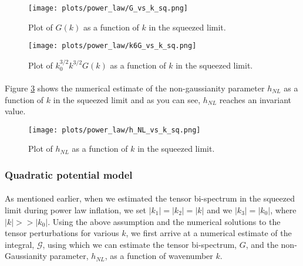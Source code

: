\documentclass[12pt,a4paper,oneside]{book}
\begin{document}
\begin{figure}
\begin{center}
\texttt{[image: plots/power\_law/G\_vs\_k\_sq.png]}
\caption[Plot of $G(k)$ as a function of $k$ in the squeezed limit in power law inflation.]
{Plot of $G(k)$ as a function of $k$ in the squeezed limit.}
\label{fig:sq_G_vs_k}
\end{center}
\end{figure}

\begin{figure}
\begin{center}
\texttt{[image: plots/power\_law/k6G\_vs\_k\_sq.png]}
\caption[Plot of $k_0^{3/2}k^{3/2}G(k)$ as a function of $k$ in the squeezed limit in power law inflation.]
{Plot of $k_0^{3/2}k^{3/2}G(k)$ as a function of $k$ in the squeezed limit.}
\label{fig:sq_k6G_vs_k}
\end{center}
\end{figure}

\paragraph*{} Figure \ref{fig:sq_h_NL_vs_k} shows the numerical estimate of the 
non-gaussianity parameter $h_{NL}$ as a function of $k$ in the squeezed limit and 
as you can see, $h_{NL}$ reaches an invariant value.

\begin{figure}
\begin{center}
\texttt{[image: plots/power\_law/h\_NL\_vs\_k\_sq.png]}
\caption[Plot of $h_{NL}$ as a function of $k$ in the squeezed limit in power law inflation.]
{Plot of $h_{NL}$ as a function of $k$ in the squeezed limit.}
\label{fig:sq_h_NL_vs_k}
\end{center}
\end{figure}

\subsubsection{Quadratic potential model}

\paragraph*{} As mentioned earlier, when we estimated the tensor bi-spectrum 
in the squeezed limit during power law inflation, we set $|k_1|=|k_2|=|k|$ and 
we $|k_3|=|k_0|$, where $|k|>>|k_0|$. Using the above assumption and 
the numerical solutions to the tensor perturbations for various $k$, we first 
arrive at a numerical estimate of the integral, $\mathcal{G}$, using which we 
can estimate the tensor bi-spectrum, $G$, and the non-Gaussianity parameter, $h_{NL}$, 
as a function of wavenumber $k$.
\end{document}
